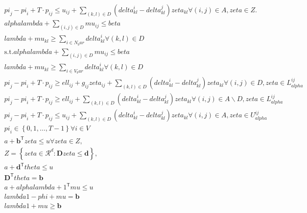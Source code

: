 \begin{align}
  & \mathit{pi}_{j} - \mathit{pi}_{i} + T \cdot p_{i j} \leq u_{i j} + \sum_{\left(k , l\right) \in D} \left(\mathit{delta}_{k l}^{i} - \mathit{delta}_{k l}^{j}\right) \mathit{zeta}_{k l} \forall \left(i , j\right) \in A , \mathit{zeta} \in Z . \tag{eq\_0027} \\
  & \mathit{alpha} \mathit{lambda} + \sum_{\left(i , j\right) \in D} \mathit{mu}_{i j} \leq \mathit{beta} \tag{eq\_0028\_a} \\
  & \mathit{lambda} + \mathit{mu}_{k l} \geq \sum_{i \in N_bar} \mathit{delta}_{k l}^{i} \forall \left(k , l\right) \in D \tag{eq\_0028\_b} \\
  & \text{s}.\text{t}. \mathit{alpha} \mathit{lambda} + \sum_{\left(i , j\right) \in D} \mathit{mu}_{i j} \leq \mathit{beta} \tag{eq\_0030} \\
  & \mathit{lambda} + \mathit{mu}_{k l} \geq \sum_{i \in V_bar} \mathit{delta}_{k l}^{i} \forall \left(k , l\right) \in D \tag{eq\_0031} \\
  & \mathit{pi}_{j} - \mathit{pi}_{i} + T \cdot p_{i j} \geq \mathit{ell}_{i j} + g_{i j} \mathit{zeta}_{i j} + \sum_{\left(k , l\right) \in D} \left(\mathit{delta}_{k l}^{i} - \mathit{delta}_{k l}^{j}\right) \mathit{zeta}_{k l} \forall \left(i , j\right) \in D , \mathit{zeta} \in L_{\mathit{alpha}}^{i j} \tag{eq\_0032} \\
  & \mathit{pi}_{j} - \mathit{pi}_{i} + T \cdot p_{i j} \geq \mathit{ell}_{i j} + \sum_{\left(k , l\right) \in D} \left(\mathit{delta}_{k l}^{i} - \mathit{delta}_{k l}^{j}\right) \mathit{zeta}_{k l} \forall \left(i , j\right) \in A \backslash D , \mathit{zeta} \in L_{\mathit{alpha}}^{i j} \tag{eq\_0033} \\
  & \mathit{pi}_{j} - \mathit{pi}_{i} + T \cdot p_{i j} \leq u_{i j} + \sum_{\left(k , l\right) \in D} \left(\mathit{delta}_{k l}^{i} - \mathit{delta}_{k l}^{j}\right) \mathit{zeta}_{k l} \forall \left(i , j\right) \in A , \mathit{zeta} \in U_{\mathit{alpha}}^{i j} \tag{eq\_0034} \\
  & \mathit{pi}_{i} \in \left\{0 , 1 , \ldots , T - 1\right\} \forall i \in V \tag{eq\_0036} \\
  & a + \mathbf{b}^{\mathsf{T}} \mathbf{\mathit{\mathit{zeta}}} \leq u \forall \mathbf{\mathit{\mathit{zeta}}} \in Z , \tag{eq\_0044} \\
  & Z = \left\{\mathbf{\mathit{\mathit{zeta}}} \in \mathcal{R}^{d} : \mathbf{D} \mathbf{\mathit{\mathit{zeta}}} \leq \mathbf{d}\right\} , \tag{eq\_0045} \\
  & a + \mathbf{d}^{\mathsf{T}} \mathbf{\mathit{\mathit{theta}}} \leq u \tag{eq\_0048} \\
  & \mathbf{D}^{\mathsf{T}} \mathbf{\mathit{\mathit{theta}}} = \mathbf{b} \tag{eq\_0049} \\
  & a + \mathit{alpha} \mathit{lambda} + 1^{\mathsf{T}} \mathbf{\mathit{\mathit{mu}}} \leq u \tag{eq\_0051} \\
  & \mathit{lambda} 1 - \mathbf{\mathit{\mathit{phi}}} + \mathbf{\mathit{\mathit{mu}}} = \mathbf{b} \tag{eq\_0052} \\
  & \mathit{lambda} 1 + \mathbf{\mathit{\mathit{mu}}} \geq \mathbf{b} \tag{eq\_0056} \\
\end{align}

